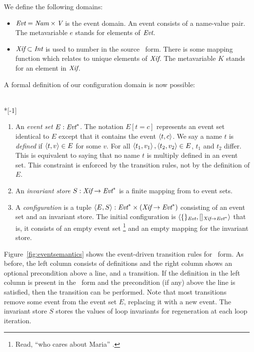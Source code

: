 \documentclass[12pt,titlepage]{article}
\begin{document}
We define the following domains:
\begin{itemize}
\item ${\mbox{\em Evt}} = {\mbox{\em Nam}} \times {\mbox{\em V}}$ is the event
domain.  An event consists of a name-value pair.  The metavariable $e$
stands for elements of ${\mbox{\em Evt}}$.
\item ${\mbox{\em Xif}} \subset {\mbox{\em Int}}$ is used to number
 in the source \ssiplus\ form.  There is some mapping
function which relates  to unique elements of
${\mbox{\em Xif}}$.  The metavariable $K$ stands for an element in
${\mbox{\em Xif}}$.
\end{itemize}

A formal definition of our configuration domain is now possible:
\begin{definition}~\\*[-1\baselineskip]
\begin{enumerate}
\item An \emph{event set} $E:{\mbox{\em Evt}}^*$.
The notation $E[t=c]$ represents an event set
identical to $E$ except that it contains the event $\left\langle t,c \right\rangle$.  We
say a name $t$ is \emph{defined} if $\left\langle t,v \right\rangle \in E$ for some $v$.
For all $\left\langle t_1,v_1 \right\rangle,\left\langle t_2,v_2 \right\rangle \in E$, $t_1$ and $t_2$
differ.  This is equivalent to saying that no name $t$ is multiply
defined in an event set.  This constraint is enforced by the
transition rules, not by the definition of $E$.
\item An \emph{invariant store} $S: {\mbox{\em Xif}} \to
{\mbox{\em Evt}}^*$ is a finite mapping from  to event sets.
\item A \emph{configuration} is a tuple
$\left\langle E, S \right\rangle:{\mbox{\em Evt}}^* \times ({\mbox{\em Xif}}\to{\mbox{\em Evt}}^*)$ consisting
of an event set and an invariant store.  The initial
configuration is
$\left\langle \{\}_{{\mbox{\scriptsize\em Evt}}},
        []_{{\mbox{\scriptsize\em Xif}} \to {\mbox{\scriptsize\em Evt}}^*} \right\rangle$
that is, it consists of an empty event set%
\footnote{Read, ``who cares about Maria'' \cite{marinov99}.}
and an empty mapping for the invariant store.%
\end{enumerate}
\end{definition}

Figure~\vref{fig:eventsemantics} shows the event-driven transition
rules for \ssiplus\ form.  As before, the left column consists of
definitions and the right column shows an optional precondition above
a line, and a transition.  If the definition in the left column is
present in the \ssiplus\ form and the precondition (if any) above the
line is satisfied, then the transition can be performed.  Note that
most transitions remove some event from the event set $E$, replacing
it with a new event.  The invariant store $S$ stores
the values of loop invariants for regeneration at each loop iteration.
\end{document}
